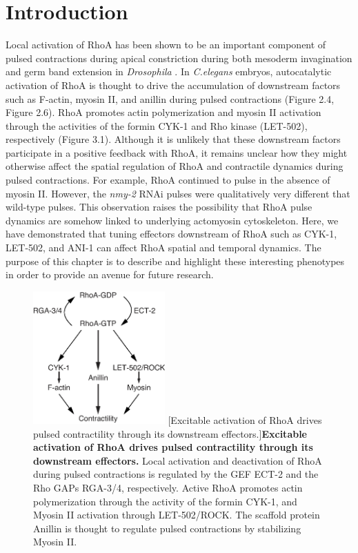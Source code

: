\documentclass{ucetd}
\begin{document}
\section{Introduction}
Local activation of RhoA has been shown to be an important component of pulsed contractions during apical constriction during both mesoderm invagination and germ band extension in \textit{Drosophila} \cite{Mason:2013ee, Munjal:2015bx, Mason:2016bs}.  In \textit{C.elegans} embryos, autocatalytic activation of RhoA is thought to drive the accumulation of downstream factors such as F-actin, myosin II, and anillin during pulsed contractions (Figure 2.4, Figure 2.6).  RhoA promotes actin polymerization and myosin II activation through the activities of the formin CYK-1 and Rho kinase (LET-502), respectively (Figure 3.1).  Although it is unlikely that these downstream factors participate in a positive feedback with RhoA, it remains unclear how they might otherwise affect the spatial regulation of RhoA and contractile dynamics during pulsed contractions.  For example, RhoA continued to pulse in the absence of myosin II.  However, the \textit{nmy-2} RNAi pulses were qualitatively very different that wild-type pulses.  This observation raises the possibility that RhoA pulse dynamics are somehow linked to underlying actomyosin cytoskeleton.  Here, we have demonstrated that tuning effectors downstream of RhoA such as CYK-1, LET-502, and ANI-1 can affect RhoA spatial and temporal dynamics.  The purpose of this chapter is to describe and highlight these interesting phenotypes in order to provide an avenue for future research.
\begin{figure}[!htbp]
\centering
\includegraphics[width=0.45\textwidth]{Figure3-1}
[Excitable activation of RhoA drives pulsed contractility through its downstream effectors.]{\textbf{Excitable activation of RhoA drives pulsed contractility through its downstream effectors.} Local activation and deactivation of RhoA during pulsed contractions is regulated by the GEF ECT-2 and the Rho GAPs RGA-3/4, respectively. Active RhoA promotes actin polymerization through the activity of the formin CYK-1, and Myosin II activation through LET-502/ROCK.  The scaffold protein Anillin is thought to regulate pulsed contractions by stabilizing Myosin II. }
\end{figure}
\end{document}
